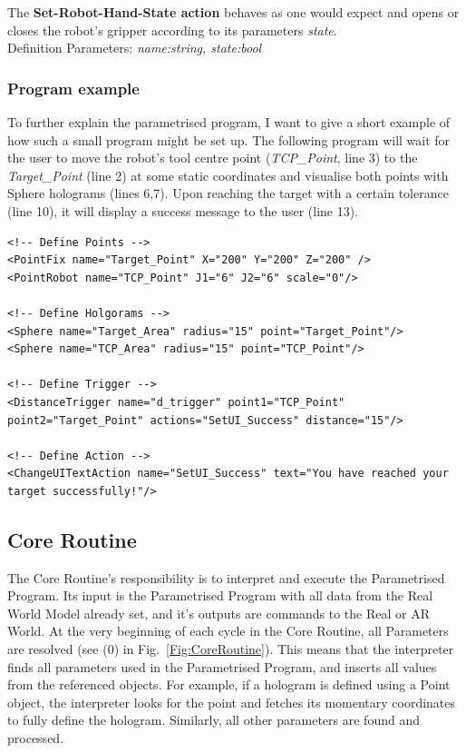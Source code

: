The \textbf{Set-Robot-Hand-State action} behaves as one would expect and opens or closes the robot's gripper according to its parameters \textit{state}.\\Definition Parameters: \textit{name:string, state:bool}

\subsubsection{Program example}
To further explain the parametrised program, I want to give a short example of how such a small program might be set up. The following program will wait for the user to move the robot's tool centre point (\textit{TCP\_Point}, line 3) to the \textit{Target\_Point} (line 2) at some static coordinates and visualise both points with Sphere holograms (lines 6,7). Upon reaching the target with a certain tolerance (line 10), it will display a success message to the user (line 13).

\begin{lstlisting}
<!-- Define Points -->
<PointFix name="Target_Point" X="200" Y="200" Z="200" />
<PointRobot name="TCP_Point" J1="6" J2="6" scale="0"/>

<!-- Define Holgorams -->
<Sphere name="Target_Area" radius="15" point="Target_Point"/>
<Sphere name="TCP_Area" radius="15" point="TCP_Point"/>

<!-- Define Trigger -->
<DistanceTrigger name="d_trigger" point1="TCP_Point" point2="Target_Point" actions="SetUI_Success" distance="15"/>
	
<!-- Define Action -->
<ChangeUITextAction name="SetUI_Success" text="You have reached your target successfully!"/>
\end{lstlisting}


\subsection{Core Routine}
The Core Routine's responsibility is to interpret and execute the Parametrised Program. Its input is the Parametrised Program with all data from the Real World Model already set, and it's outputs are commands to the Real or AR World. At the very beginning of each cycle in the Core Routine, all Parameters are resolved (see (0) in Fig.~\ref{Fig:CoreRoutine}). This means that the interpreter finds all parameters used in the Parametrised Program, and inserts all values from the referenced objects. For example, if a hologram is defined using a Point object, the interpreter looks for the point and fetches its momentary coordinates to fully define the hologram. Similarly, all other parameters are found and processed.

